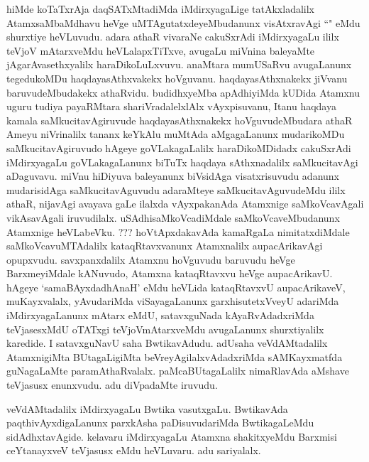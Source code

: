 \begin{artha}
hiMde koTaTxrAja daqSATxMtadiMda iMdirxyagaLige tatAkxladalilx AtamxsaMbaMdhavu heVge uMTAgutatxdeyeMbudanunx visAtxravAgi ``\stext " eMdu shurxtiye heVLuvudu. adara athaR vivaraNe cakuSxrAdi iMdirxyagaLu ililx teVjoV mAtarxveMdu heVLalapxTiTxve, avugaLu miVnina baleyaMte jAgarAvasethxyalilx haraDikoLuLxvuvu. anaMtara mumUSaRvu avugaLanunx tegedukoMDu haqdayasAthxvakekx hoVguvanu. haqdayasAthxnakekx jiVvanu baruvudeMbudakekx athaRvidu. budidhxyeMba apAdhiyiMda kUDida Atamxnu uguru tudiya payaRMtara shariVradalelxlAlx vAyxpisuvanu, Itanu haqdaya kamala saMkucitavAgiruvude haqdayasAthxnakekx hoVguvudeMbudara athaR Ameyu niVrinalilx tananx keYkAlu muMtAda aMgagaLanunx mudarikoMDu saMkucitavAgiruvudo hAgeye goVLakagaLalilx haraDikoMDidadx cakuSxrAdi iMdirxyagaLu goVLakagaLanunx biTuTx haqdaya sAthxnadalilx saMkucitavAgi aDaguvavu. miVnu hiDiyuva baleyanunx biVsidAga visatxrisuvudu adanunx mudarisidAga saMkucitavAguvudu adaraMteye saMkucitavAguvudeMdu ililx athaR, nijavAgi avayava gaLe ilalxda vAyxpakanAda Atamxnige saMkoVcavAgali vikAsavAgali iruvudilalx. uSAdhisaMkoVcadiMdale saMkoVcaveMbudanunx Atamxnige heVLabeVku. ??? hoVtApxdakavAda kamaRgaLa nimitatxdiMdale saMkoVcavuMTAdalilx kataqRtavxvanunx Atamxnalilx aupacArikavAgi opupxvudu. savxpanxdalilx Atamxnu hoVguvudu baruvudu heVge BarxmeyiMdale kANuvudo, Atamxna kataqRtavxvu heVge aupacArikavU. hAgeye `samaBAyxdadhAnaH' eMdu heVLida kataqRtavxvU aupacArikaveV, muKayxvalalx, yAvudariMda viSayagaLanunx garxhisutetxVveyU adariMda iMdirxyagaLanunx mAtarx eMdU, satavxguNada kAyaRvAdadxriMda teVjasesxMdU oTATxgi teVjoVmAtarxveMdu avugaLanunx shurxtiyalilx karedide. I satavxguNavU saha BwtikavAdudu. adUsaha veVdAMtadalilx AtamxnigiMta BUtagaLigiMta beVreyAgilalxvAdadxriMda sAMKayxmatfda guNagaLaMte paramAthaRvalalx. paMcaBUtagaLalilx nimaRlavAda aMshave teVjasusx enunxvudu. adu diVpadaMte iruvudu. 
\end{artha}

\begin{artha}
veVdAMtadalilx iMdirxyagaLu Bwtika vasutxgaLu. BwtikavAda paqthivAyxdigaLanunx parxkAsha paDisuvudariMda BwtikagaLeMdu sidAdhxtavAgide. kelavaru iMdirxyagaLu Atamxna shakitxyeMdu Barxmisi ceYtanayxveV teVjasusx eMdu heVLuvaru. adu sariyalalx. 
\end{artha}

